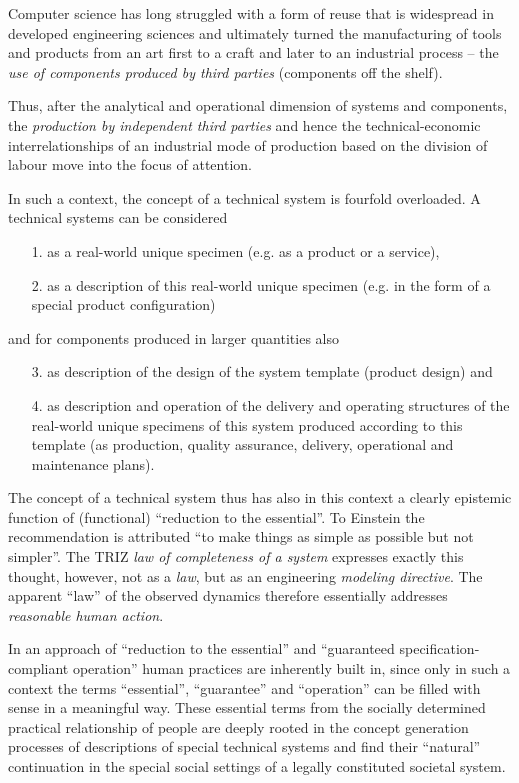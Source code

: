\documentclass[11pt,a4paper]{article}
\begin{document}
Computer science has long struggled with a form of reuse that is widespread in
developed engineering sciences and ultimately turned the manufacturing of
tools and products from an art first to a craft and later to an industrial
process -- the \emph{use of components produced by third parties} (components
off the shelf).

Thus, after the analytical and operational dimension of systems and
components, the \emph{production by independent third parties} and hence the
technical-economic interrelationships of an industrial mode of production
based on the division of labour move into the focus of attention.

In such a context, the concept of a technical system is fourfold overloaded.
A technical systems can be considered
\begin{itemize}
\item [1.] as a real-world unique specimen (e.g. as a product or a service),
\item [2.] as a description of this real-world unique specimen (e.g. in the
  form of a special product configuration)
\end{itemize}
and for components produced in larger quantities also
\begin{itemize}
\item [3.] as description of the design of the system template (product
  design) and
\item [4.] as description and operation of the delivery and operating
  structures of the real-world unique specimens of this system produced
  according to this template (as production, quality assurance, delivery,
  operational and maintenance plans).
\end{itemize}
The concept of a technical system thus has also in this context a clearly
epistemic function of (functional) ``reduction to the essential''. To Einstein
the recommendation is attributed ``to make things as simple as possible but
not simpler''. The TRIZ \emph{law of completeness of a system} expresses
exactly this thought, however, not as a \emph{law}, but as an engineering
\emph{modeling directive}. The apparent ``law'' of the observed dynamics
therefore essentially addresses \emph{reasonable human action}.

In an approach of ``reduction to the essential'' and ``guaranteed
specification-compliant operation'' human practices are inherently built in,
since only in such a context the terms ``essential'', ``guarantee'' and
``operation'' can be filled with sense in a meaningful way. These essential
terms from the socially determined practical relationship of people are deeply
rooted in the concept generation processes of descriptions of special
technical systems and find their ``natural'' continuation in the special
social settings of a legally constituted societal system.
\end{document}
